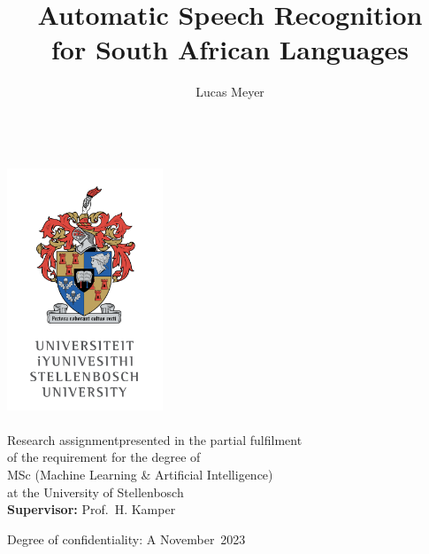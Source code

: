 \documentclass[11pt,oneside]{report}
\title{Automatic Speech Recognition\\for South African Languages}           %
\author{Lucas Meyer}							                                          %
\makeatletter
\newif\ifmodule
\newcommand\studentnumber{22614524}                                         %
\newcommand\fulldegree{MSc (Machine Learning \& Artificial Intelligence)}   %
\newcommand\supervisor{H. Kamper}                                           %
\newcommand\supervisortitle{Prof.}                                          %
\newcommand\degreeofconf{A}                                                 %
\newcommand\yeardate{2023}								                                  %
\newcommand\monthdate{November}                                             %
\newcommand\projecttype{Research assignment}                                %
\let\thetitle\@title
\let\theauthor\@author
\makeatother
\begin{document}
\renewcommand*\listfigurename{LIST OF FIGURES} 
\renewcommand*\listtablename{LIST OF TABLES} 
\renewcommand{\appendixname}{APPENDIX}
\newtheorem{theorem}{Theorem}
\newtheorem{corollary}[theorem]{Corollary}
\newtheorem{lemma}[theorem]{Lemma}
\newtheorem{definition}[theorem]{Definition}
\ifmodule \renewcommand{\chaptername}{Task} \fi



\begin{titlepage}
	\centering
	\vspace{5cm}
	\LARGE\textbf{\thetitle}\\[1 cm]                       %
    \includegraphics[width=0.35\textwidth]{SU_Crest.png}\\[1 cm]	%
	\LARGE \textbf{\theauthor}\\ \ifmodule  \textbf{\studentnumber} \\ \fi \vspace{1.5cm} 
	\normalsize \projecttype \text{ }presented in the partial fulfilment\\
	of the requirement for the \ifmodule course \else degree of \fi \\
	\fulldegree \\
	\ifmodule \monthdate \ \yeardate \else at the University of Stellenbosch \fi \\
	\vspace{1cm}
	\textbf{\ifmodule Lecturer: \else Supervisor: \fi}\supervisortitle \ \supervisor 
	\vspace{0.75cm}
	\ifmodule \else
	\begin{flushleft}
	Degree of confidentiality: \degreeofconf \hspace{22em} \monthdate \ \yeardate
	\end{flushleft}
	\fi
\end{titlepage}
\end{document}
